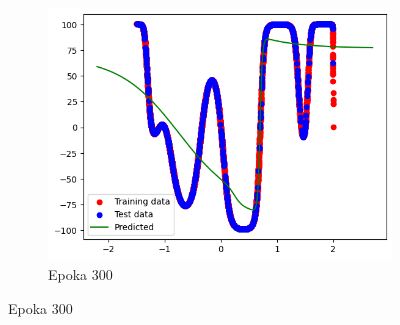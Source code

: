 \documentclass{article}
\begin{document}
\begin{figure}[H]
    \hfill
    \begin{subfigure}{0.32\textwidth}
        \includegraphics[width=\linewidth]{img/ae3/mml3.png}
        \caption{Epoka 300}
    \end{subfigure}
\end{figure}
\end{document}
